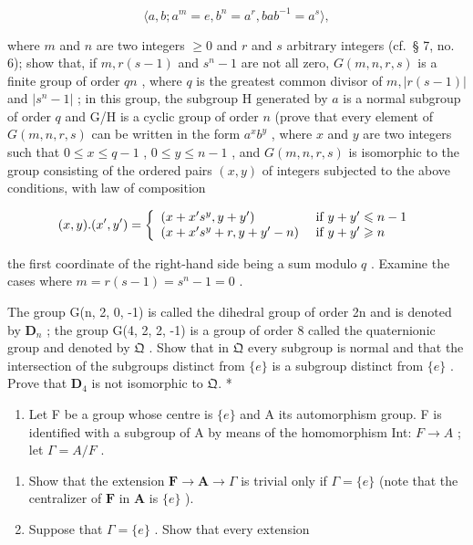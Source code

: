 \[
\langle a, b; a ^ {m} = e, b ^ {n} = a ^ {r}, b a b ^ {- 1} = a ^ {s} \rangle ,
\]

where \(m\) and \(n\) are two integers \(\geqslant 0\) and \(r\) and \(s\) arbitrary integers (cf.~§ 7, no. 6); show that, if \(m, r(s - 1)\) and \(s^n - 1\) are not all zero, \(G(m, n, r, s)\) is a finite group of order \(qn\) , where \(q\) is the greatest common divisor of \(m, |r(s - 1)|\) and \(|s^n - 1|\) ; in this group, the subgroup H generated by \(a\) is a normal subgroup of order \(q\) and G/H is a cyclic group of order \(n\) (prove that every element of \(G(m, n, r, s)\) can be written in the form \(a^x b^y\) , where \(x\) and \(y\) are two integers such that \(0 \leqslant x \leqslant q - 1\) , \(0 \leqslant y \leqslant n - 1\) , and \(G(m, n, r, s)\) is isomorphic to the group consisting of the ordered pairs \((x, y)\) of integers subjected to the above conditions, with law of composition

\[
(x, y). (x ^ {\prime}, y ^ {\prime}) = \left\{ \begin{array}{l l} (x + x ^ {\prime} s ^ {y}, y + y ^ {\prime}) & \text { if } y + y ^ {\prime} \leqslant n - 1 \\ (x + x ^ {\prime} s ^ {y} + r, y + y ^ {\prime} - n) & \text { if } y + y ^ {\prime} \geqslant n \end{array} \right.
\]

the first coordinate of the right-hand side being a sum modulo \(q\) . Examine the cases where \(m = r(s - 1) = s^n - 1 = 0\) .

The group G(n, 2, 0, -1) is called the dihedral group of order 2n and is denoted by \(\mathbf{D}_{n}\) ; the group G(4, 2, 2, -1) is a group of order 8 called the quaternionic group and denoted by \(\mathfrak{Q}\) . Show that in \(\mathfrak{Q}\) every subgroup is normal and that the intersection of the subgroups distinct from \(\{e\}\) is a subgroup distinct from \(\{e\}\) . Prove that \(\mathbf{D}_{4}\) is not isomorphic to \(\mathfrak{Q}.\) *

\begin{enumerate}
\def\labelenumi{\arabic{enumi}.}
\setcounter{enumi}{4}
\tightlist
\item
  Let F be a group whose centre is \(\{e\}\) and A its automorphism group. F is identified with a subgroup of A by means of the homomorphism Int: \(F \rightarrow A\) ; let \(\Gamma = A/F\) .
\end{enumerate}

\begin{enumerate}
\def\labelenumi{(\alph{enumi})}
\item
  Show that the extension \(\mathbf{F} \to \mathbf{A} \to \Gamma\) is trivial only if \(\Gamma = \{e\}\) (note that the centralizer of \(\mathbf{F}\) in \(\mathbf{A}\) is \(\{e\}\) ).
\item
  Suppose that \(\Gamma = \{e\}\) . Show that every extension
\end{enumerate}

